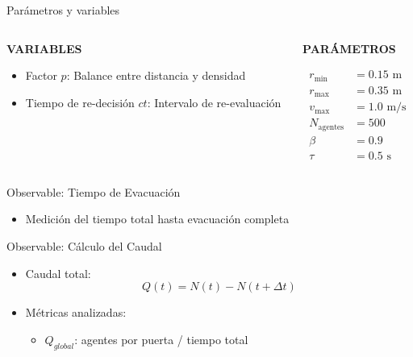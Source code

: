 \documentclass[aspectratio=169]{beamer}
\begin{document}
\begin{frame}{Parámetros y variables}
    \begin{columns}
        \begin{column}{0.5\textwidth}
            {\centering\textbf{VARIABLES}\par}
            \vspace{0.5em}
            \begin{itemize}
                \item Factor $p$: Balance entre distancia y densidad
                \item Tiempo de re-decisión $ct$: Intervalo de re-evaluación
            \end{itemize}
        \end{column}
        \begin{column}{0.5\textwidth}
            {\centering\textbf{PARÁMETROS}\par}
            \vspace{0.5em}
            \begin{align*}
                r_{\text{min}} &= 0.15\text{ m} \\
                r_{\text{max}} &= 0.35\text{ m} \\
                v_{\text{max}} &= 1.0\text{ m/s} \\
                N_{\text{agentes}} &= 500 \\
                \beta &= 0.9 \\
                \tau &= 0.5\text{ s}
            \end{align*}
        \end{column}
    \end{columns}
\end{frame}

\begin{frame}{Observable: Tiempo de Evacuación}
    \begin{itemize}
        \item Medición del tiempo total hasta evacuación completa
    \end{itemize}
\end{frame}

\begin{frame}{Observable: Cálculo del Caudal}
    \begin{itemize}
        \item Caudal total:
        \begin{equation}
            Q(t) = N(t) - N(t + \Delta t)
        \end{equation}
        \item Métricas analizadas:
        \begin{itemize}
            \item $Q_{global}$: agentes por puerta / tiempo total
        \end{itemize}
    \end{itemize}
\end{frame}
\end{document}
